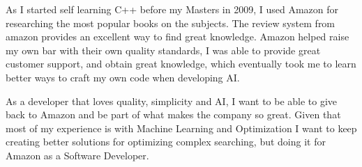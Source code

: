 As I started self learning C++ before my Masters in 2009, I used Amazon for researching the most popular books on the subjects. The review system from amazon provides an excellent way to find great knowledge. Amazon helped raise my own bar with their own quality standards, I was able to provide great customer support, and obtain great knowledge, which eventually took me to learn better ways to craft my own code when developing AI. 
		
As a developer that loves quality, simplicity and AI, I want to be able to give back to Amazon and be part of what makes the company so great. Given that most of my experience is with Machine Learning and Optimization I want to keep creating better solutions for optimizing complex searching, but doing it for Amazon as a Software Developer. 
